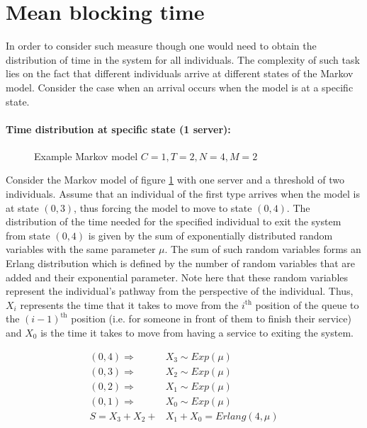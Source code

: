 \section{Mean blocking time} \label{sec:appendix_mean_proportion}
    
In order to consider such measure though one would need to obtain the 
distribution of time in the system for all individuals. 
The complexity of such task lies on the fact that different individuals arrive 
at different states of the Markov model. 
Consider the case when an arrival occurs when the model is at a specific state.

\paragraph{Time distribution at specific state (1 server):}

\begin{figure}[H]
    \centering
    \scalebox{0.75}{
        
    }
    \caption{Example Markov model \(C=1, T=2, N=4, M=2\)}
    \label{fig:distribution_of_time_at_specific_state_1_server}
\end{figure}

Consider the Markov model of figure 
\ref{fig:distribution_of_time_at_specific_state_1_server} with one server and a 
threshold of two individuals. 
Assume that an individual of the first type arrives when the model is at state 
\((0,3)\), thus forcing the model to move to state \((0,4)\). 
The distribution of the time needed for the specified individual to exit the 
system from state \((0,4)\) is given by the sum of exponentially distributed 
random variables with the same parameter \(\mu\). 
The sum of such random variables forms an Erlang distribution which is defined 
by the number of random variables that are added and their exponential 
parameter.
Note here that these random variables represent the individual's pathway from 
the perspective of the individual. 
Thus, \(X_i\) represents the time that it takes to move from the 
\(i^{\text{th}}\) position of the queue to the \((i-1)^{\text{th}}\) position 
(i.e. for someone in front of them to finish their service) and \(X_0\) is the 
time it takes to move from having a service to exiting the system.

\begin{align}
    (0,4) \Rightarrow \quad & X_3 \sim Exp(\mu) \nonumber \\
    (0,3) \Rightarrow \quad & X_2 \sim Exp(\mu) \nonumber \\
    (0,2) \Rightarrow \quad & X_1 \sim Exp(\mu) \nonumber \\
    (0,1) \Rightarrow \quad & X_0 \sim Exp(\mu) \nonumber \\
    S = X_3 + X_2 + & X_1 + X_0 = Erlang(4, \mu)
\end{align}

